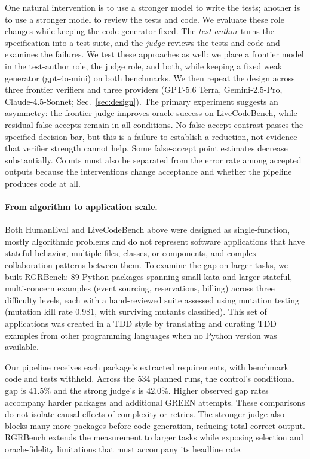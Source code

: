 \documentclass{article}
\begin{document}
One natural intervention is to use a stronger model to write the tests; another is to use
a stronger model to review the tests and code. We evaluate these role changes while keeping
the code generator fixed. The \emph{test author} turns the
specification into a test suite, and the \emph{judge} reviews the tests and code and examines the
failures. We test these approaches as well: we place a frontier model in the test-author role, the
judge role, and both, while keeping a fixed weak generator (gpt-4o-mini) on both benchmarks. We
then repeat the design across three frontier verifiers and three providers (GPT-5.6 Terra,
Gemini-2.5-Pro, Claude-4.5-Sonnet; Sec.~\ref{sec:design}). The primary experiment suggests an
asymmetry: the frontier judge improves oracle success on LiveCodeBench, while residual false
accepts remain in all conditions. No false-accept contrast passes the specified decision bar,
but this is a failure to establish a reduction, not evidence that verifier strength cannot
help. Some false-accept point estimates decrease substantially. Counts must also be separated
from the error rate among accepted outputs because the interventions change acceptance and
whether the pipeline produces code at all.

\paragraph{From algorithm to application scale.} Both HumanEval and LiveCodeBench above were
designed as single-function, mostly algorithmic problems and do not represent software applications
that have stateful behavior, multiple files, classes, or components, and complex collaboration
patterns between them. To examine the gap on larger tasks, we
built RGRBench: $89$ Python packages spanning small kata and larger stateful, multi-concern
examples (event sourcing, reservations, billing) across three difficulty levels, each with a hand-reviewed suite assessed
using mutation testing (mutation kill rate $0.981$, with surviving mutants classified). This
set of applications was created in a TDD style by translating and curating TDD examples from other
programming languages when no Python version was available.

Our pipeline receives each package's extracted requirements, with benchmark code and tests
withheld. Across the $534$ planned runs, the control's conditional gap is $41.5\%$ and the
strong judge's is $42.0\%$. Higher observed gap rates accompany harder packages and additional
GREEN attempts. These comparisons do not isolate causal effects of complexity or retries.
The stronger judge also blocks many more packages before code generation, reducing total
correct output. RGRBench extends the measurement to larger tasks while exposing selection
and oracle-fidelity limitations that must accompany its headline rate.
\end{document}
